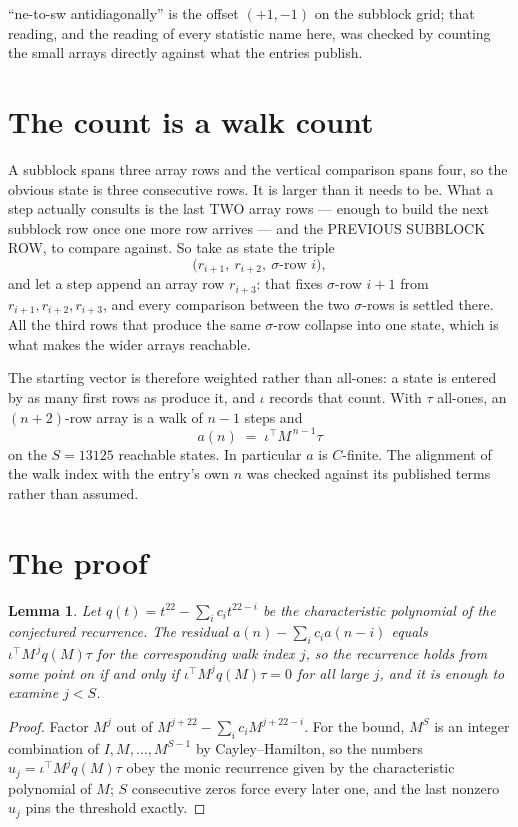 \documentclass[11pt,a4paper]{article}
\theoremstyle{plain}
\newtheorem{lemma}[theorem]{Lemma}
\theoremstyle{definition}
\begin{document}
``ne-to-sw antidiagonally'' is the offset $(+1,-1)$ on the subblock grid; that reading, and
the reading of every statistic name here, was checked by counting the small arrays directly
against what the entries publish.

\section{The count is a walk count}

A subblock spans three array rows and the vertical comparison spans four, so the obvious state
is three consecutive rows. It is larger than it needs to be. What a step actually consults is
the last TWO array rows --- enough to build the next subblock row once one more row arrives ---
and the PREVIOUS SUBBLOCK ROW, to compare against. So take as state the triple
\[
\bigl(r_{i+1},\ r_{i+2},\ \sigma\text{-row }i\bigr),
\]
and let a step append an array row $r_{i+3}$: that fixes $\sigma$-row $i+1$ from
$r_{i+1},r_{i+2},r_{i+3}$, and every comparison between the two $\sigma$-rows is settled
there. All the third rows that produce the same $\sigma$-row collapse into one state, which is
what makes the wider arrays reachable.

The starting vector is therefore weighted rather than all-ones: a state is entered by as many
first rows as produce it, and $\iota$ records that count. With $\tau$ all-ones, an
$(n+2)$-row array is a walk of $n-1$ steps and
\[
a(n)\;=\;\iota^{\!\top}M^{\,n-1}\tau
\]
on the $S=13125$ reachable states. In particular $a$ is $C$-finite. The alignment of the walk
index with the entry's own $n$ was checked against its published terms rather than assumed.

\section{The proof}

\begin{lemma}\label{lem:crit}
Let $q(t)=t^{22}-\sum_i c_it^{22-i}$ be the characteristic polynomial of the
conjectured recurrence. The residual $a(n)-\sum_ic_ia(n-i)$ equals
$\iota^{\!\top}M^{\,j}q(M)\tau$ for the corresponding walk index $j$, so the recurrence
holds from some point on if and only if $\iota^{\!\top}M^{j}q(M)\tau=0$ for all large $j$,
and it is enough to examine $j<S$.
\end{lemma}

\begin{proof}
Factor $M^{j}$ out of $M^{j+22}-\sum_ic_iM^{j+22-i}$. For the bound, $M^{S}$
is an integer combination of $I,M,\dots,M^{S-1}$ by Cayley--Hamilton, so the numbers
$u_j=\iota^{\!\top}M^{j}q(M)\tau$ obey the monic recurrence given by the characteristic
polynomial of $M$; $S$ consecutive zeros force every later one, and the last nonzero $u_j$
pins the threshold exactly.
\end{proof}
\end{document}
